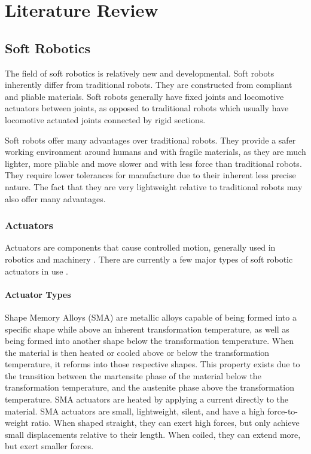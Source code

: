 \chapter{Literature Review}
\label{chp:LR}


\section{Soft Robotics}

The field of soft robotics is relatively new and developmental. Soft robots inherently differ from traditional robots. They are constructed from compliant and pliable materials. Soft robots generally have fixed joints and locomotive actuators between joints, as opposed to traditional robots which usually have locomotive actuated joints connected by rigid sections. \cite{Whitesides2018}

Soft robots offer many advantages over traditional robots. They provide a safer working environment around humans and with fragile materials, as they are much lighter, more pliable and move slower and with less force than traditional robots. They require lower tolerances for manufacture due to their inherent less precise nature. The fact that they are very lightweight relative to traditional robots may also offer many advantages. \cite{Whitesides2018}

\subsection{Actuators}

Actuators are components that cause controlled motion, generally used in robotics and machinery \cite{Sekhar2012}. There are currently a few major types of soft robotic actuators in use \cite{Boyraz2018}.

\subsubsection{Actuator Types}

Shape Memory Alloys (SMA) are metallic alloys capable of being formed into a specific shape while above an inherent transformation temperature, as well as being formed into another shape below the transformation temperature. When the material is then heated or cooled above or below the transformation temperature, it reforms into those respective shapes. This property exists due to the transition between the martensite phase of the material below the transformation temperature, and the austenite phase above the transformation temperature. SMA actuators are heated by applying a current directly to the material. SMA actuators are small, lightweight, silent, and have a high force-to-weight ratio. When shaped straight, they can exert high forces, but only achieve small displacements relative to their length. When coiled, they can extend more, but exert smaller forces. \cite{Villoslada2015}

